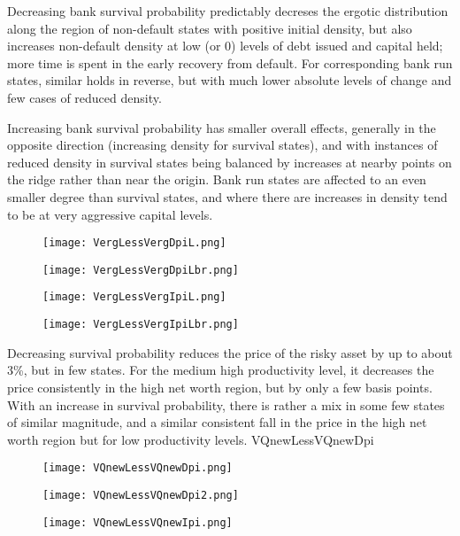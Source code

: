 \documentclass[english]{article}
\begin{document}
Decreasing bank survival probability predictably decreses the ergotic distribution along 
the region of non-default states with positive initial density, but also increases non-default 
density at low (or 0) levels of debt issued and capital held; more time is spent in the early 
recovery from default. For corresponding bank run states, similar holds in reverse, but with much lower 
absolute levels of change and few cases of reduced density. 

Increasing bank survival probability has smaller overall effects, generally in the opposite 
direction (increasing density for survival states), and with instances of reduced density 
in survival states being balanced by increases at nearby points on the ridge rather than 
near the origin. Bank run states are affected to an even smaller degree than survival states, 
and where there are increases in density tend to be at very aggressive capital levels.

\begin{figure}[H]
\centering
		\texttt{[image: VergLessVergDpiL.png]}
\end{figure}
\begin{figure}[H]
\centering
		\texttt{[image: VergLessVergDpiLbr.png]}
\end{figure}
\begin{figure}[H]
\centering
		\texttt{[image: VergLessVergIpiL.png]}
\end{figure}
\begin{figure}[H]
\centering
		\texttt{[image: VergLessVergIpiLbr.png]}
\end{figure}

Decreasing survival probability reduces the price of the risky asset by 
up to about 3\%, but in few states. For the medium high productivity level, 
it decreases the price consistently in the high net worth region, but by only a few 
basis points. With an increase in survival probability, there is rather a mix in some 
few states of similar magnitude, and a similar consistent fall in the price in the 
high net worth region but for low productivity levels.
VQnewLessVQnewDpi

\begin{figure}[H]
\centering
		\texttt{[image: VQnewLessVQnewDpi.png]}
\end{figure}
\begin{figure}[H]
\centering
		\texttt{[image: VQnewLessVQnewDpi2.png]}
\end{figure}
\begin{figure}[H]
\centering
		\texttt{[image: VQnewLessVQnewIpi.png]}
\end{figure}
\end{document}
